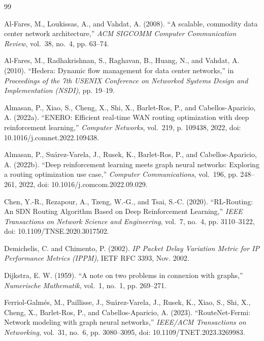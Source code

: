 \documentclass[12pt,a4paper,oneside]{report}
\begin{document}
\begin{thebibliography}{99}

Al-Fares, M., Loukissas, A., and Vahdat, A. (2008). ``A scalable, commodity data center network architecture,'' \emph{ACM SIGCOMM Computer Communication Review}, vol.~38, no.~4, pp. 63--74.

Al-Fares, M., Radhakrishnan, S., Raghavan, B., Huang, N., and Vahdat, A. (2010). ``Hedera: Dynamic flow management for data center networks,'' in \emph{Proceedings of the 7th USENIX Conference on Networked Systems Design and Implementation (NSDI)}, pp. 19--19.

Almasan, P., Xiao, S., Cheng, X., Shi, X., Barlet-Ros, P., and Cabellos-Aparicio, A. (2022a). ``ENERO: Efficient real-time WAN routing optimization with deep reinforcement learning,'' \emph{Computer Networks}, vol.~219, p. 109438, 2022, doi: 10.1016/j.comnet.2022.109438.

Almasan, P., Su\'{a}rez-Varela, J., Rusek, K., Barlet-Ros, P., and Cabellos-Aparicio, A. (2022b). ``Deep reinforcement learning meets graph neural networks: Exploring a routing optimization use case,'' \emph{Computer Communications}, vol.~196, pp. 248--261, 2022, doi: 10.1016/j.comcom.2022.09.029.

Chen, Y.-R., Rezapour, A., Tzeng, W.-G., and Tsai, S.-C. (2020). ``RL-Routing: An SDN Routing Algorithm Based on Deep Reinforcement Learning,'' \emph{IEEE Transactions on Network Science and Engineering}, vol.~7, no.~4, pp. 3110--3122, doi: 10.1109/TNSE.2020.3017502.

Demichelis, C. and Chimento, P. (2002). \emph{{IP Packet Delay Variation Metric for IP Performance Metrics (IPPM)}}, IETF RFC 3393, Nov. 2002.

Dijkstra, E. W. (1959). ``A note on two problems in connexion with graphs,'' \emph{Numerische Mathematik}, vol.~1, no.~1, pp. 269--271.

Ferriol-Galm\'{e}s, M., Paillisse, J., Su\'{a}rez-Varela, J., Rusek, K., Xiao, S., Shi, X., Cheng, X., Barlet-Ros, P., and Cabellos-Aparicio, A. (2023). ``RouteNet-Fermi: Network modeling with graph neural networks,'' \emph{IEEE/ACM Transactions on Networking}, vol.~31, no.~6, pp. 3080--3095, doi: 10.1109/TNET.2023.3269983.


\end{thebibliography}
\end{document}

